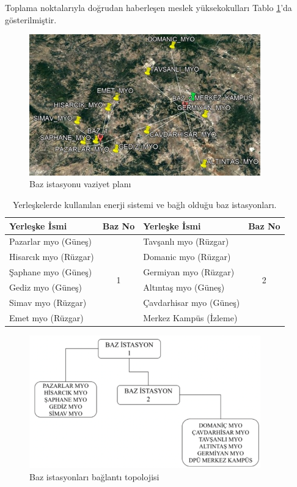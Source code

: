 Toplama noktalarıyla doğrudan haberleşen meslek yüksekokulları Tablo \ref{tab:tablo4-6}'da gösterilmiştir.



\begin{figure}[htbp]
\centerline{\includegraphics[width=10cm]{Resim/sekil4-27.jpg}}
\caption{Baz istasyonu vaziyet planı}
\label{fig:4-28}
\end{figure}




\begin{table}[htbp]
\centering
\caption{Yerleşkelerde kullanılan enerji sistemi ve bağlı olduğu baz istasyonları.}
\label{tab:tablo4-6}
\begin{tabular}{|l|c|l|c|}
\hline
Yerleşke İsmi        & \multicolumn{1}{l|}{Baz No} & Yerleşke İsmi         & \multicolumn{1}{l|}{Baz No} \\ \hline
Pazarlar \gls{myo} (Güneş) & \multirow{6}{*}{1}          & Tavşanlı \gls{myo} (Rüzgar) & \multirow{6}{*}{2}          \\ \cline{1-1} \cline{3-3}
Hisarcık \gls{myo} (Rüzgar) &  & Domanic \gls{myo} (Rüzgar)    &  \\ \cline{1-1} \cline{3-3}
Şaphane \gls{myo} (Güneş)   &  & Germiyan \gls{myo} (Rüzgar)   &  \\ \cline{1-1} \cline{3-3}
Gediz \gls{myo} (Güneş)     &  & Altıntaş \gls{myo} (Güneş)    &  \\ \cline{1-1} \cline{3-3}
Simav \gls{myo} (Rüzgar)    &  & Çavdarhisar \gls{myo} (Güneş) &  \\ \cline{1-1} \cline{3-3}
Emet \gls{myo} (Rüzgar)     &  & Merkez Kampüs (İzleme)  &  \\ \hline
\end{tabular}
\end{table}


\begin{figure}[htbp]
\centerline{\includegraphics[width=10cm]{Resim/sekil4-28.png}}
\caption{Baz istasyonları bağlantı topolojisi}
\label{fig:4-29}
\end{figure}

